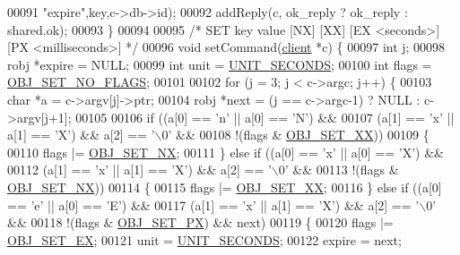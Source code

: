 \begin{DoxyCode}
{00091         \textcolor{stringliteral}{"expire"},key,c->db->id);
00092     addReply(c, ok\_reply ? ok\_reply : shared.ok);
00093 \}
00094 
00095 \textcolor{comment}{/* SET key value [NX] [XX] [EX <seconds>] [PX <milliseconds>] */}
00096 \textcolor{keywordtype}{void} setCommand(\hyperlink{structclient}{client} *c) \{
00097     \textcolor{keywordtype}{int} j;
00098     robj *expire = NULL;
00099     \textcolor{keywordtype}{int} unit = \hyperlink{server_8h_a8553b0a6c729b15594731a0d37b4fb0d}{UNIT\_SECONDS};
00100     \textcolor{keywordtype}{int} flags = \hyperlink{t__string_8c_a066d0cea68eb46959e4de40ad0115c5b}{OBJ\_SET\_NO\_FLAGS};
00101 
00102     \textcolor{keywordflow}{for} (j = 3; j < c->argc; j++) \{
00103         \textcolor{keywordtype}{char} *a = c->argv[j]->ptr;
00104         robj *next = (j == c->argc-1) ? NULL : c->argv[j+1];
00105 
00106         \textcolor{keywordflow}{if} ((a[0] == \textcolor{stringliteral}{'n'} || a[0] == \textcolor{stringliteral}{'N'}) &&
00107             (a[1] == \textcolor{stringliteral}{'x'} || a[1] == \textcolor{stringliteral}{'X'}) && a[2] == \textcolor{stringliteral}{'\(\backslash\)0'} &&
00108             !(flags & \hyperlink{t__string_8c_a01e9fee690658334c3fa5fb0dfed3ed8}{OBJ\_SET\_XX}))
00109         \{
00110             flags |= \hyperlink{t__string_8c_ad2c320e7c632cb6c42ff431ec0d0bfaf}{OBJ\_SET\_NX};
00111         \} \textcolor{keywordflow}{else} \textcolor{keywordflow}{if} ((a[0] == \textcolor{stringliteral}{'x'} || a[0] == \textcolor{stringliteral}{'X'}) &&
00112                    (a[1] == \textcolor{stringliteral}{'x'} || a[1] == \textcolor{stringliteral}{'X'}) && a[2] == \textcolor{stringliteral}{'\(\backslash\)0'} &&
00113                    !(flags & \hyperlink{t__string_8c_ad2c320e7c632cb6c42ff431ec0d0bfaf}{OBJ\_SET\_NX}))
00114         \{
00115             flags |= \hyperlink{t__string_8c_a01e9fee690658334c3fa5fb0dfed3ed8}{OBJ\_SET\_XX};
00116         \} \textcolor{keywordflow}{else} \textcolor{keywordflow}{if} ((a[0] == \textcolor{stringliteral}{'e'} || a[0] == \textcolor{stringliteral}{'E'}) &&
00117                    (a[1] == \textcolor{stringliteral}{'x'} || a[1] == \textcolor{stringliteral}{'X'}) && a[2] == \textcolor{stringliteral}{'\(\backslash\)0'} &&
00118                    !(flags & \hyperlink{t__string_8c_a7b6e95f021b2885665c3ac078df68509}{OBJ\_SET\_PX}) && next)
00119         \{
00120             flags |= \hyperlink{t__string_8c_a57e6bca7c3405142669c40d9d254a81e}{OBJ\_SET\_EX};
00121             unit = \hyperlink{server_8h_a8553b0a6c729b15594731a0d37b4fb0d}{UNIT\_SECONDS};
00122             expire = next;
}
\end{DoxyCode}
